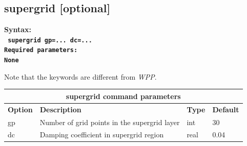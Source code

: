 \documentclass[11pt]{report}
\begin{document}
\subsection{supergrid [optional]} \label{sec:supergrid}
\label{keyword:supergrid}
\begin{flushleft}\bf
Syntax:\\
\tt
supergrid gp=... dc=...
\\
\bf Required parameters:\\
\rm
None
\end{flushleft}
Note that the keywords are different from \emph{WPP}.
\begin{center}
\begin{tabular}{|l|p{10cm}|l|l|} \hline
\multicolumn{4}{|c|}{\bf supergrid command parameters}\\ \hline
\bf{Option} & \bf{Description} & \bf{Type} & \bf{Default} \\ \hline \hline
%
gp &  Number of grid points in the supergrid layer & int & 30\\ \hline
%
dc & Damping coefficient in supergrid region & real & 0.04 \\ \hline
\end{tabular}
\end{center}

\end{document}
